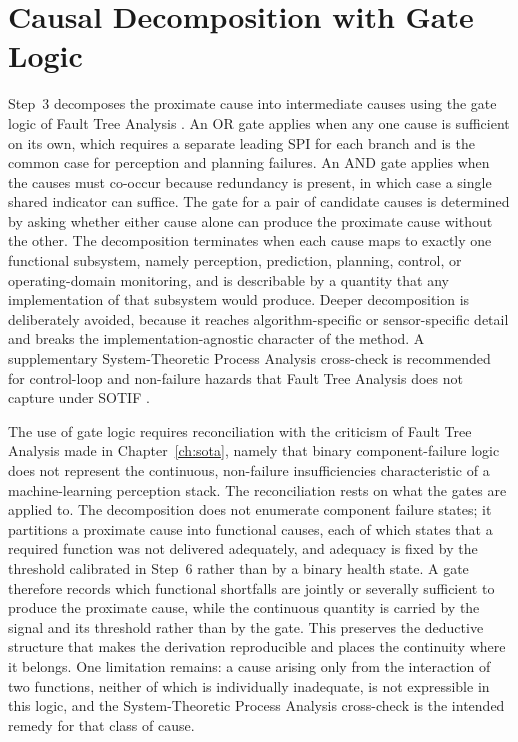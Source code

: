 \section{Causal Decomposition with Gate Logic}
\label{sec:method_decomposition}

Step~3 decomposes the proximate cause into intermediate causes using the gate logic of
Fault Tree Analysis \cite{iec61025}. An OR gate applies when any one cause is
sufficient on its own, which requires a separate leading SPI for each branch and
is the common case for perception and planning failures. An AND gate applies when the
causes must co-occur because redundancy is present, in which case a single shared
indicator can suffice. The gate for a pair of candidate causes is determined by asking
whether either cause alone can produce the proximate cause without the other. The
decomposition terminates when each cause maps to exactly one functional subsystem,
namely perception, prediction, planning, control, or operating-domain monitoring, and
is describable by a quantity that any implementation of that subsystem would produce.
Deeper decomposition is deliberately avoided, because it reaches algorithm-specific or
sensor-specific detail and breaks the implementation-agnostic character of the method.
A supplementary System-Theoretic Process Analysis cross-check is recommended for
control-loop and non-failure hazards that Fault Tree Analysis does not capture under
\ac{SOTIF} \cite{iso21448,stpahandbook}.

The use of gate logic requires reconciliation with the criticism of Fault Tree Analysis
made in Chapter~\ref{ch:sota}, namely that binary component-failure logic does not
represent the continuous, non-failure insufficiencies characteristic of a
machine-learning perception stack. The reconciliation rests on what the gates are
applied to. The decomposition does not enumerate component failure states; it partitions
a proximate cause into functional causes, each of which states that a required function
was not delivered adequately, and adequacy is fixed by the threshold calibrated in
Step~6 rather than by a binary health state. A gate therefore records which functional
shortfalls are jointly or severally sufficient to produce the proximate cause, while the
continuous quantity is carried by the signal and its threshold rather than by the gate.
This preserves the deductive structure that makes the derivation reproducible and places
the continuity where it belongs. One limitation remains: a cause arising only from the interaction of two functions, neither of which
is individually inadequate, is not expressible in this logic, and the System-Theoretic
Process Analysis cross-check is the intended remedy for that class of cause.

